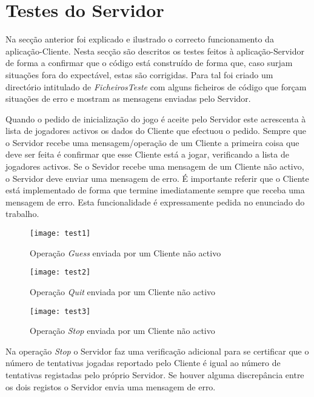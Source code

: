 \section{Testes do Servidor}

Na secção anterior foi explicado e ilustrado o correcto funcionamento da aplicação-Cliente. Nesta secção são descritos os testes feitos à aplicação-Servidor de forma a confirmar que o código está construído de forma que, caso surjam situações fora do expectável, estas são corrigidas. Para tal foi criado um directório intitulado de \textit{FicheirosTeste} com alguns ficheiros de código que forçam situações de erro e mostram as mensagens enviadas pelo Servidor.

Quando o pedido de inicialização do jogo é aceite pelo Servidor este acrescenta à lista de jogadores activos os dados do Cliente que efectuou o pedido.
Sempre que o Servidor recebe uma mensagem/operação de um Cliente a primeira coisa que deve ser feita é confirmar que esse Cliente está a jogar, verificando a lista de jogadores activos. Se o Sevidor recebe uma mensagem de um Cliente não activo, o Servidor deve enviar uma mensagem de erro.
É importante referir que o Cliente está implementado de forma que termine imediatamente sempre que receba uma mensagem de erro. Esta funcionalidade é expressamente pedida no enunciado do trabalho. 

\begin{figure}[H]
	\centering
	\texttt{[image: test1]}
	\caption{Operação \textit{Guess} enviada por um Cliente não activo\\}
	\label{fig:test1}
\end{figure} 

\begin{figure}[H]
	\centering
	\texttt{[image: test2]}
	\caption{Operação \textit{Quit} enviada por um Cliente não activo\\}
	\label{fig:test2}
\end{figure} 

\begin{figure}[H]
	\centering
	\texttt{[image: test3]}
	\caption{Operação \textit{Stop} enviada por um Cliente não activo\\}
	\label{fig:test3}
\end{figure} 

Na operação \textit{Stop} o Servidor faz uma verificação adicional para se certificar que o número de tentativas jogadas reportado pelo Cliente é igual ao número de tentativas registadas pelo próprio Servidor. Se houver alguma discrepância entre os dois registos o Servidor envia uma mensagem de erro.


